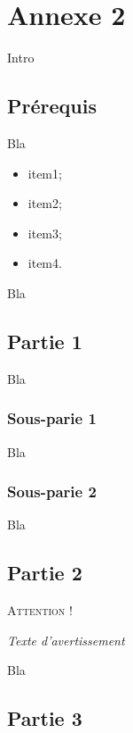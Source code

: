 \chapter*{Annexe 2}

\setcounter{section}{0}

Intro

\section*{Prérequis}

Bla

\begin{itemize}
\item item1;
\item item2;
\item item3;
\item item4.
\end{itemize}

Bla

\section{Partie 1}

Bla

\subsection{Sous-parie 1}

Bla

\subsection{Sous-parie 2}

Bla

\section{Partie 2}

\begin{center}
\textsc{Attention !}

\textit{Texte d'avertissement}
\end{center}

Bla

\newpage

\section{Partie 3}

